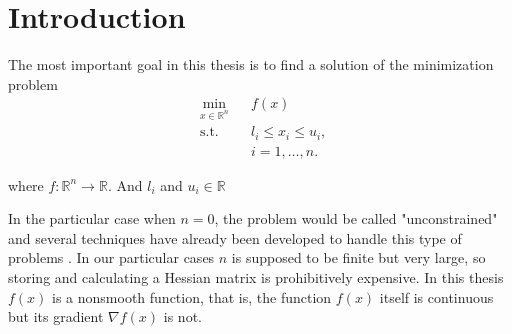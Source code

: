 
\chapter{Introduction} %

\label{Chapter1} %


The most important goal in this thesis is to find a solution of the minimization problem 
\begin{equation} \label{mainproblem}
  \begin{aligned}
    & \underset{x \in \mathbb{R}^n}{\text{min}}
    & & f(x) \\
    & \text{s.t.}
    & & l_i \leq x_i \leq u_i , \; \\
    & & & i = 1, \ldots, n.
  \end{aligned}
\end{equation}

where $f \colon \mathbb{R}^n \to \mathbb{R}$.  And $l_i$ and $u_i \in \mathbb{R}$

In the particular case when $n = 0$, the problem would be called "unconstrained" and several techniques have already been developed to handle this type of problems \citep{unconstrained}.  In our particular cases $n$ is supposed to be finite but very large, so storing and calculating a Hessian matrix is prohibitively expensive.  In this thesis $f(x)$ is a nonsmooth function, that is, the function $f(x)$ itself is continuous but its gradient $\nabla f(x)$ is not.

